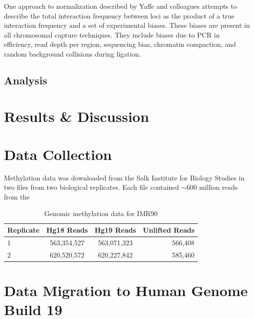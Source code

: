 \documentclass[phd,tocprelim]{cornell}
\begin{document}
One approach to normalization described by Yaffe and colleagues\cite{yaffe2011}
attempts to describe the total interaction frequency between loci as the product
of a true interaction frequency and a set of experimental biases.  These biases
are present in all chromosomal capture techniques.  They include biases due to
PCR in efficiency, read depth per region, sequencing bias, chromatin compaction,
and random background collisions during ligation\cite{benner2014}\cite{dekker2006}.




\section{Analysis}






\chapter{Results \& Discussion}


%
%

\appendix
\appendixpage%
\addappheadtotoc%
\chapter{Data Collection}

Methylation data was downloaded from the Salk Institute for Biology Studies in
two files from two biological replicates.  Each file contained $\sim600$ million
reads from the

\begin{table}
  \centering
  \begin{tabular}{lccr}
    \hline
    Replicate & Hg18 Reads & Hg19 Reads & Unlifted Reads \\ \hline
    1 & 563,354,527 & 563,071,323 & 566,408 \\
    2 & 620,520,572 & 620,227,842 & 585,460 \\
    \hline
  \end{tabular}
  \caption{Genomic methylation data for IMR90}
\end{table}

\chapter{Data Migration to Human Genome Build 19}
\end{document}

